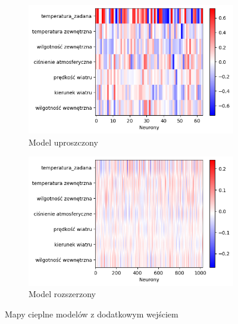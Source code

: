 \documentclass[a4paper,twoside,12pt]{book}
\begin{document}
\begin{figure}[!h]
  \centering
  \begin{subfigure}{0.49\textwidth}
    \includegraphics[width=\textwidth]{img/heatmap1_zdodatkowym.png}
    \caption{Model uproszczony}
    \label{fig:lewy-gorny}
  \end{subfigure}
  \hfill
  \begin{subfigure}{0.49\textwidth}
    \includegraphics[width=\textwidth]{img/heatmap2_zdodatkowym.png}
    \caption{Model rozszerzony}
    \label{fig:prawy-gorny}
  \end{subfigure}
  \caption{Mapy cieplne modelów z dodatkowym wejściem}
  \label{fig:wiele-rysunkow}
\end{figure}
\end{document}
